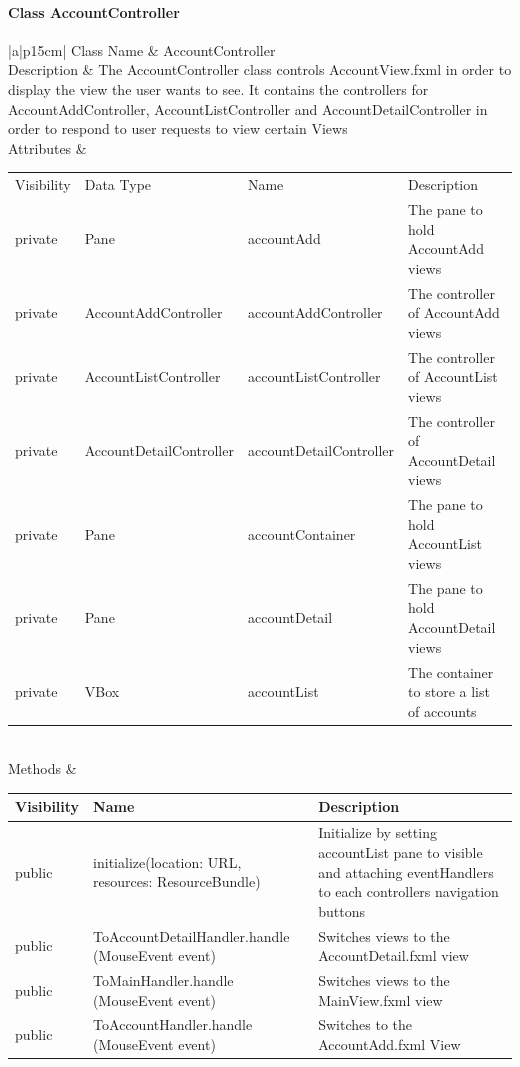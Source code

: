\documentclass[12pt]{article}
\begin{document}
\paragraph{Class AccountController}
\begin{table}[H]
	\begin{tabular}{|a|p{15cm}|}
		\hline
		{Class Name} & {AccountController} \\
		\hline
		Description & The AccountController class controls AccountView.fxml in order to display the view the user wants to see. It contains the controllers for AccountAddController, AccountListController and AccountDetailController in order to respond to user requests to view certain Views\\
		\hline
		Attributes & 
		\begin{tabular}{| p{1.5cm} | p{4.4cm} | p{4.1cm} | p{3.45cm} |}
			\hline
			\rowcolor{lightgray}
			Visibility & Data Type & Name & Description \\
			\rowcolor{white}
			\hline
			private &  Pane & accountAdd & The pane to hold AccountAdd views\\
			\hline
			private& AccountAddController& accountAddController& The controller of AccountAdd views\\
			\hline
			private& AccountListController& accountListController& The controller of AccountList views\\
			\hline
			private &AccountDetailController &accountDetailController&The controller of AccountDetail views\\
			\hline
			private& Pane &accountContainer&The pane to hold AccountList views\\
			\hline
			private &Pane& accountDetail& The pane to hold AccountDetail views\\
			\hline
			private & VBox & accountList & The container to store a list of accounts\\
			\hline
		\end{tabular} \\
		\hline
		Methods & 		 
		\begin{tabular}{| p{1.7cm} | p{7.0cm} | p{5.2cm} |}
			\hline
			\rowcolor{gray}
			{Visibility} &{Name} & {Description} \\
			\hline
			\rowcolor{white}			
			public &  initialize(location: URL, resources: ResourceBundle) & Initialize by setting accountList pane to visible and attaching eventHandlers to each controllers navigation buttons\\
			\hline
			public &  ToAccountDetailHandler.handle (MouseEvent event) & Switches views to the AccountDetail.fxml view\\
			\hline
			public &  ToMainHandler.handle (MouseEvent event) & Switches views to the MainView.fxml view\\
			\hline			
			public& ToAccountHandler.handle (MouseEvent event) & Switches to the AccountAdd.fxml View \\
			\hline
		\end{tabular}								 
	\end{tabular}
\end{table}
\end{document}
